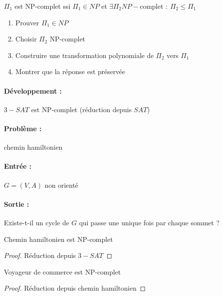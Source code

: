 \begin{proposition}
	$\Pi_1$ est NP-complet ssi $\Pi_1 \in NP$ et $\exists \Pi_2 NP-$complet $: \: \Pi_2 \leq \Pi_1$
\end{proposition}

\begin{personalise}
	\begin{enumerate}
		\item Prouver $\Pi_1 \in NP$
		\item Choisir $\Pi_2$ NP-complet
		\item Construire une transformation polynomiale de $\Pi_2$ vers $\Pi_1$
		\item Montrer que la réponse est préservée
	\end{enumerate}
\end{personalise}

\paragraph{Développement :} $3-SAT$ est NP-complet (réduction depuis $SAT$)

\begin{example}
	\paragraph{Problème :} chemin hamiltonien
	\paragraph{Entrée :} $G = (V, A)$ non orienté
	\paragraph{Sortie :} Existe-t-il un cycle de $G$ qui passe une unique fois par chaque sommet ?
\end{example}

\begin{proposition}
	Chemin hamiltonien est NP-complet
\end{proposition}

\begin{proof}
	Réduction depuis $3-SAT$
\end{proof}

\begin{proposition}
	Voyageur de commerce est NP-complet
\end{proposition}
\begin{proof}
	Réduction depuis chemin hamiltonien
\end{proof}

